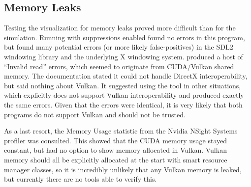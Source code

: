 \subsection{Memory Leaks}\label{sec:Results:Viz:Memory}
Testing the visualization for memory leaks proved more difficult than for the simulation.
Running  with suppressions enabled found no errors in this program, but found many potential errors (or more likely false-positives) in the SDL2 windowing library and the underlying X windowing system.
 produced a host of ``Invalid read'' errors, which seemed to originate from CUDA/Vulkan shared memory.
The documentation stated it could not handle DirectX interoperability\cite{NvidiaCudaMemcheckIssues}, but said nothing about Vulkan.
It suggested using the  tool in other situations, which explicitly does not support Vulkan interoperability\cite{NvidiaComputeSanitizerRelease} and produced exactly the same errors.
Given that the errors were identical, it is very likely that both programs do not support Vulkan and should not be trusted.

As a last resort, the Memory Usage statistic from the Nvidia NSight Systems profiler was consulted.
This showed that the CUDA memory usage stayed constant, but had no option to show memory allocated in Vulkan.
Vulkan memory should all be explicitly allocated at the start with smart resource manager classes, so it is incredibly unlikely that any Vulkan memory is leaked, but currently there are no tools able to verify this.
